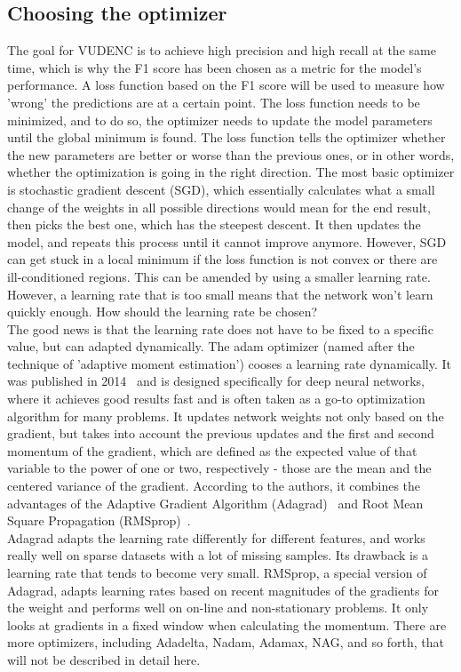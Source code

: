\documentclass[
a4paper,
pagesize,
pdftex,
12pt,
twoside, %
BCOR=5mm, %
ngerman,
fleqn,
final,
]{scrartcl}
\begin{document}
	\subsection{Choosing the optimizer}\label{optimizer}
	The goal for VUDENC is to achieve high precision and high recall at the same time, which is why the F1 score has been chosen as a metric for the model's performance. A loss function based on the F1 score will be used to measure how 'wrong' the predictions are at a certain point. The loss function needs to be minimized, and to do so, the optimizer needs to update the model parameters until the global minimum is found. The loss function tells the optimizer whether the new parameters are better or worse than the previous ones, or in other words, whether the optimization is going in the right direction. The most basic optimizer is stochastic gradient descent (SGD), which essentially calculates what a small change of the weights in all possible directions would mean for the end result, then picks the best one, which has the steepest descent. It then updates the model, and repeats this process until it cannot improve anymore. However, SGD can get stuck in a local minimum if the loss function is not convex or there are ill-conditioned regions. This can be amended by using a smaller learning rate. However, a learning rate that is too small means that the network won't learn quickly enough. How should the learning rate be chosen?\\
	The good news is that the learning rate does not have to be fixed to a specific value, but can adapted dynamically. The adam optimizer (named after the technique of 'adaptive moment estimation') cooses a learning rate dynamically. It was published in 2014~\cite{Kingma.2014} and is designed specifically for deep neural networks, where it achieves good results fast and is often taken as a go-to optimization algorithm for many problems. It updates network weights not only based on the gradient, but takes into account the previous updates and the first and second momentum of the gradient, which are defined as the expected value of that variable to the power of one or two, respectively - those are the mean and the centered variance of the gradient. According to the authors, it combines the advantages of the Adaptive Gradient Algorithm (Adagrad)~\cite{Duchi.2011} and Root Mean Square Propagation (RMSprop)~\cite{Tieleman.2012}.\\
	Adagrad adapts the learning rate differently for different features, and works really well on sparse datasets with a lot of missing samples. Its drawback is a learning rate that tends to become very small. RMSprop, a special version of Adagrad, adapts learning rates based on recent magnitudes of the gradients for the weight and performs well on on-line and non-stationary problems. It only looks at gradients in a fixed window when calculating the momentum. There are more optimizers, including Adadelta, Nadam, Adamax, NAG, and so forth, that will not be described in detail here.\\
\end{document}
